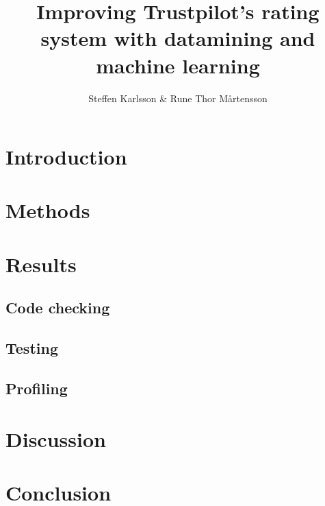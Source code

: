 \documentclass[10pt]{IEEEtran}
\title{Improving Trustpilot's rating system with datamining and machine learning}
\author{Steffen Karlsson \& Rune Thor Mårtensson}
\begin{document}
\maketitle

\begin{abstract}

\end{abstract}

\section{Introduction}


\section{Methods}


\section{Results}


\subsection{Code checking}


\subsection{Testing}


\subsection{Profiling}


\section{Discussion}


\section{Conclusion}
\end{document}
